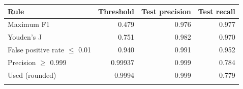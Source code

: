 \documentclass[pdflatex,sn-nature]{sn-jnl}%
\begin{document}
\begin{center}
\footnotesize
\begin{tabular}{@{}lrrr@{}}
\toprule
Rule & Threshold & Test precision & Test recall \\
\midrule
Maximum F1 & 0.479 & 0.976 & 0.977 \\
Youden's J & 0.751 & 0.982 & 0.970 \\
False positive rate $\le$ 0.01 & 0.940 & 0.991 & 0.952 \\
Precision $\ge$ 0.999 & 0.99937 & 0.999 & 0.784 \\
Used (rounded) & 0.9994 & 0.999 & 0.779 \\
\botrule
\end{tabular}
\end{center}

\clearpage

\end{document}
